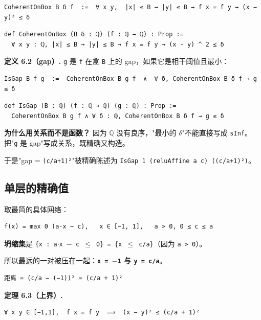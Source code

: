 \documentclass[11pt,a4paper]{ctexart}
\begin{document}
\begin{lstlisting}
CoherentOnBox B δ f  :=  ∀ x y,  |x| ≤ B → |y| ≤ B → f x = f y → (x − y)² ≤ δ
\end{lstlisting}

\begin{lstlisting}
def CoherentOnBox (B δ : ℚ) (f : ℚ → ℚ) : Prop :=
  ∀ x y : ℚ, |x| ≤ B → |y| ≤ B → f x = f y → (x - y) ^ 2 ≤ δ
\end{lstlisting}

\textbf{定义 6.2（gap）.} \texttt{g} 是 \texttt{f} 在盒 \texttt{B} 上的 gap，如果它是相干阈值且最小：

\begin{lstlisting}
IsGap B f g  :=  CoherentOnBox B g f  ∧  ∀ δ, CoherentOnBox B δ f → g ≤ δ
\end{lstlisting}

\begin{lstlisting}
def IsGap (B : ℚ) (f : ℚ → ℚ) (g : ℚ) : Prop :=
  CoherentOnBox B g f ∧ ∀ δ : ℚ, CoherentOnBox B δ f → g ≤ δ
\end{lstlisting}

\textbf{为什么用关系而不是函数？} 因为 \ensuremath{\mathbb{Q}} 没有良序，"最小的 \texttt{\ensuremath{\delta}}"不能直接写成 \texttt{sInf}。把"\texttt{g} 是 gap"写成关系，既精确又构造。

于是"gap = \texttt{(c/a+1)²}"被精确陈述为 \texttt{IsGap 1 (reluAffine a c) ((c/a+1)²)}。

\subsection{单层的精确值}

取最简的具体网络：

\begin{lstlisting}
f(x) = max 0 (a·x − c),   x ∈ [−1, 1],   a > 0, 0 ≤ c ≤ a
\end{lstlisting}

\textbf{坍缩集}是 \texttt{\{x : a\ensuremath{\cdot}x \ensuremath{-} c \ensuremath{\le} 0\} = \{x \ensuremath{\le} c/a\}}（因为 \texttt{a > 0}）。

所以最远的一对被压在一起：\textbf{\texttt{x = \ensuremath{-}1} 与 \texttt{y = c/a}}。

\begin{lstlisting}
距离 = (c/a − (−1))² = (c/a + 1)²
\end{lstlisting}

\textbf{定理 6.3（上界）.}

\begin{lstlisting}
∀ x y ∈ [−1,1],  f x = f y  ⟹  (x − y)² ≤ (c/a + 1)²
\end{lstlisting}
\end{document}

